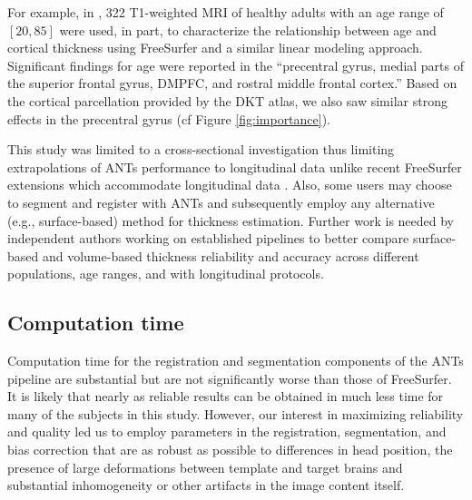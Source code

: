 For example, in \cite{hogstrom2013},
322 T1-weighted MRI of healthy adults with an age range of $[20,85]$ were 
used, in part, to characterize the relationship between age and cortical 
thickness using FreeSurfer and a similar linear modeling approach.  Significant findings
for age were reported in the ``precentral gyrus, medial parts of the 
superior frontal gyrus, DMPFC, and rostral middle frontal cortex.'' Based
on the cortical parcellation provided by the DKT atlas, we also saw similar
strong effects in the precentral gyrus (cf Figure \ref{fig:importance}).



This study was limited to a cross-sectional investigation thus limiting
extrapolations of ANTs performance to longitudinal data unlike
recent FreeSurfer extensions which accommodate longitudinal data \citep{reuter2012,jovicich2013}.  
Also, some users may choose to segment and register
with ANTs and subsequently employ any alternative (e.g., surface-based)
method for thickness estimation.  Further work is needed by
independent authors working on established pipelines 
to better compare surface-based and volume-based thickness reliability
and accuracy across different populations, age ranges, and with 
longitudinal protocols. 

\subsection{Computation time}
Computation time for the registration and segmentation components of
the ANTs pipeline are substantial but are not significantly worse than
those of FreeSurfer.  It is likely that nearly as reliable
results can be obtained in much less time for many of the subjects in
this study.  However, our interest in
maximizing reliability and quality led us to employ parameters in the
registration, segmentation, and bias correction that are as robust as
possible to differences in head position, the presence of large
deformations between template and target brains and substantial
inhomogeneity or other artifacts in the image content itself.  

